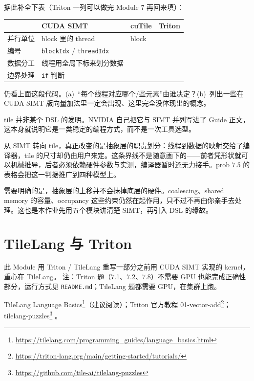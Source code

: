 \documentclass[11pt,a4paper,fontset=none]{ctexart}
\begin{document}
据此补全下表（Triton 一列可以做完 Module 7 再回来填）：

\begin{center}\small
\begin{tabular}{@{}lp{8em}p{9em}p{9em}@{}}
\toprule
 & CUDA SIMT & cuTile & Triton \\
\midrule
并行单位 & block 里的 thread & block & \\
编号 & \texttt{blockIdx} / \texttt{threadIdx} &  & \\
数据分工 & 线程用全局下标来划分数据 &  & \\
边界处理 & \texttt{if} 判断 &  & \\
\bottomrule
\end{tabular}
\end{center}

仍看上面这段代码。(a)~“每个线程对应哪个/些元素”由谁决定？(b)~列出一些在 CUDA SIMT 版向量加法里一定会出现、这里完全没体现出的概念。

\begin{lookback}
tile 并非某个 DSL 的发明。NVIDIA 自己把它与 SIMT 并列写进了 Guide 正文，这本身就说明它是一类稳定的编程方式，而不是一次工具选型。

从 SIMT 转向 tile，真正改变的是抽象层的职责划分：线程到数据的映射交给了编译器，tile 的尺寸却仍由用户来定。这条界线不是随意画下的——前者凭形状就可以机械推导，后者必须依赖硬件参数与实测，编译器暂时还无力接手。prob 7.5 的表格会把这一判据推广到四种模型上。

需要明确的是，抽象层的上移并不会抹掉底层的硬件。coalescing、shared memory 的容量、occupancy 这些约束仍然在起作用，只不过不再由你亲手去处理。这也是本作业先用五个模块讲清楚 SIMT，再引入 DSL 的缘故。
\end{lookback}

\section{TileLang 与 Triton}

此 Module 用 Triton / TileLang 重写一部分之前用 CUDA SIMT 实现的 kernel，重心在 TileLang。
注：Triton 题（7.1、7.2、7.8）不需要 GPU 也能完成正确性部分，运行方式见 \texttt{README.md}；TileLang 题都需要 GPU，在集群上跑。

\begin{reading}
TileLang Language Basics\footnote{\url{https://tilelang.com/programming_guides/language_basics.html}}（建议阅读）；Triton 官方教程 01-vector-add\footnote{\url{https://triton-lang.org/main/getting-started/tutorials/}}；tilelang-puzzles\footnote{\url{https://github.com/tile-ai/tilelang-puzzles}} 。
\end{reading}
\end{document}
